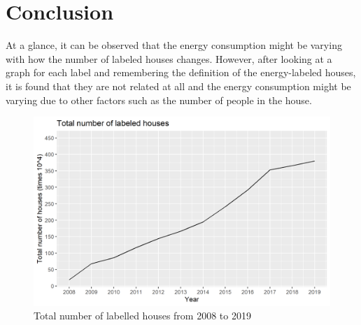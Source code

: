 \documentclass[a4paper,11pt]{article}
\begin{document}
\section{Conclusion}
At a glance, it can be observed that the energy consumption might be varying with how the number of labeled houses changes. However, after looking at a graph for each label and remembering the definition of the energy-labeled houses, it is found that they are not related at all and the energy consumption might be varying due to other factors such as the number of people in the house. 

\begin{figure}
    \centering
    \includegraphics[width=\textwidth]{Tot number of labeled houses.png}
    \caption{Total number of labelled houses from 2008 to 2019}
    \label{fig:my_label1}
\end{figure}    
\end{document}
